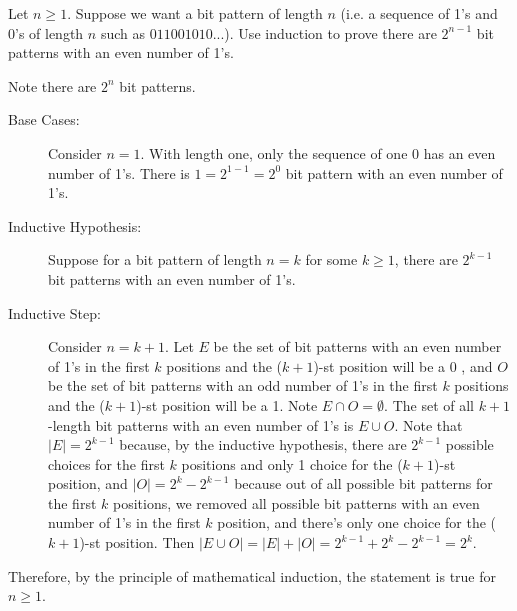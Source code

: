 \documentclass{article}
\theoremstyle{definition}
\begin{document}
\begin{question}
    Let $n\geq 1$. Suppose we want a bit pattern of length $n$ (i.e. a sequence of 1's and 0's of length $n$ such as $011001010...$). Use induction to prove there are $2^{n-1}$ bit patterns with an even number of 1's. 
\end{question}
\begin{solution}
        Note there are $2^n$ bit patterns. 
	\begin{description}
	\item[Base Cases: ] Consider $n=1$. With length one, only the sequence of one 0 has an even number of 1's. There is $1=2^{1-1} = 2^0$ bit pattern with an even number of 1's.
	
	\item[Inductive Hypothesis: ] Suppose for a bit pattern of length $n=k$ for some $k\geq 1$, there are $2^{k-1}$ bit patterns with an even number of 1's.
	
	\item[Inductive Step: ] Consider $n=k+1$. Let $E$ be the set of bit patterns with an even number of 1's in the first $k$ positions and the ($k+1$)-st position will be a 0 , and $O$ be the set of bit patterns with an odd number of 1's in the first $k$ positions and the ($k+1$)-st position will be a 1. Note $E\cap O=\emptyset$. The set of all $k+1$-length bit patterns with an even number of 1's is $E\cup O$. Note that $|E| = 2^{k-1}$ because, by the inductive hypothesis, there are $2^{k-1}$ possible choices for the first $k$ positions and only 1 choice for the ($k+1$)-st position, and $|O|=2^{k} -2^{k-1}$ because out of all possible bit patterns for the first $k$ positions, we removed all possible bit patterns with an even number of 1's in the first $k$ position, and there's only one choice for the ($k+1$)-st position. Then $|E\cup O| = |E| + |O| = 2^{k-1}+2^k-2^{k-1} = 2^k$. 
	\end{description}
	Therefore, by the principle of mathematical induction, the statement is true for $n\geq 1$.
\end{solution}
\end{document}
